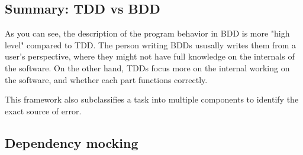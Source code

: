 \subsection{Summary: TDD vs BDD}

As you can see, the description of the program behavior in BDD is more "high level" compared to TDD. The person writing BDDs ususally writes them from a user's perspective, where they might not have full knowledge on the internals of the software. On the other hand, TDDs focus more on the internal working on the software, and whether each part functions correctly. 

This framework also subclassifies a task into multiple components to identify the exact source of error.



\subsection{Dependency mocking}
